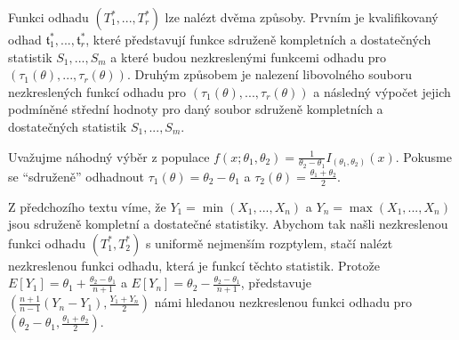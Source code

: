 Funkci odhadu $(T_1^*, ..., T_r^*)$ lze nalézt dvěma způsoby. Prvním je kvalifikovaný odhad $\mathfrak{t}_1^*, ..., \mathfrak{t}_r^*$, které představují funkce sdruženě kompletních a dostatečných statistik $S_1, ..., S_m$ a které budou nezkreslenými funkcemi odhadu pro $(\tau_1(\theta), ..., \tau_r(\theta))$. Druhým způsobem je nalezení libovolného souboru nezkreslených funkcí odhadu pro $(\tau_1(\theta), ..., \tau_r(\theta))$ a následný výpočet jejich podmíněné střední hodnoty pro daný soubor sdruženě kompletních a dostatečných statistik $S_1, ..., S_m$.

\begin{example}
Uvažujme náhodný výběr z populace $f(x; \theta_1, \theta_2) = \frac{1}{\theta_2 - \theta_1}I_{(\theta_1, \theta_2)}(x)$. Pokusme se ``sdruženě'' odhadnout $\tau_1(\theta) = \theta_2 - \theta_1$ a $\tau_2(\theta) = \frac{\theta_1 + \theta_2}{2}$.

Z předchozího textu víme, že $Y_1 = \min(X_1, ..., X_n)$ a $Y_n = \max(X_1, ..., X_n)$ jsou sdruženě kompletní a dostatečné statistiky. Abychom tak našli nezkreslenou funkci odhadu $(T_1^*, T_2^*)$ s uniformě nejmenším rozptylem, stačí nalézt nezkreslenou funkci odhadu, která je funkcí těchto statistik. Protože $E[Y_1] = \theta_1 + \frac{\theta_2 - \theta_1}{n + 1}$ a $E[Y_n] = \theta_2 - \frac{\theta_2 - \theta_1}{n + 1}$, představuje $\left(\frac{n + 1}{n - 1}(Y_n - Y_1), \frac{Y_1 + Y_n}{2}\right)$ námi hledanou nezkreslenou funkci odhadu pro $\left(\theta_2 - \theta_1, \frac{\theta_1 + \theta_2}{2}\right)$.
\end{example}

